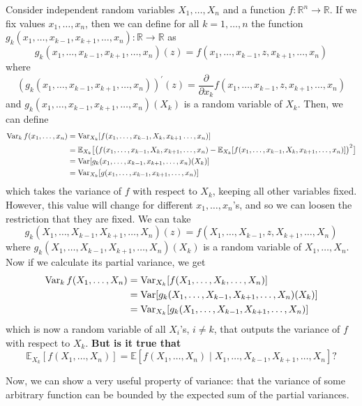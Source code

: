   Consider independent random variables $X_1, \ldots, X_n$ and a function $f: \mathbb{R}^n \longrightarrow \mathbb{R}$. If we fix values $x_1, \ldots, x_n$, then we can define for all $k = 1, \ldots, n$ the function $g_{k}(x_1, \ldots, x_{k-1}, x_{k+1}, \ldots, x_n): \mathbb{R} \rightarrow \mathbb{R}$ as 
  \[g_{k}(x_1, \ldots, x_{k-1}, x_{k+1}, \ldots, x_n)(z) = f(x_1, \ldots, x_{k-1}, z, x_{k+1}, \ldots, x_n)\]
  where 
  \[(g_{k}(x_1, \ldots, x_{k-1}, x_{k+1}, \ldots, x_n))^\prime (z) = \frac{\partial}{\partial x_k} f(x_1, \ldots, x_{k-1}, z, x_{k+1}, \ldots, x_n)\]
  and $g_k (x_1, \ldots, x_{k-1}, x_{k+1}, \ldots, x_n) (X_k)$ is a random variable of $X_k$. Then, we can define 
  \begin{align*}
      \operatorname{Var}_k f(x_1, \ldots, x_n) & = \operatorname{Var}_{X_k} [ f(x_1, \ldots, x_{k-1}, X_k, x_{k+1} \ldots, x_n)] \\ 
      & = \mathbb{E}_{X_k} \big[ \big( f (x_1, \ldots, x_{k-1}, X_k, x_{k+1}, \ldots, x_n) - \mathbb{E}_{X_k} [f (x_1, \ldots, x_{k-1}, X_k, x_{k+1}, \ldots, x_n)] \big)^2 \big] \\
      & = \operatorname{Var}[g_{k} (x_1, \ldots, x_{k-1}, x_{k+1}, \ldots, x_n) (X_k)] \\
      & = \operatorname{Var}_{X_k} [g(x_1, \ldots, x_{k-1}, x_{k+1}, \ldots, x_n)] 
  \end{align*}
  which takes the variance of $f$ with respect to $X_k$, keeping all other variables fixed. However, this value will change for different $x_1, \ldots, x_n$'s, and so we can loosen the restriction that they are fixed. We can take 
  \[g_k (X_1, \ldots, X_{k-1}, X_{k+1}, \ldots, X_n) (z) = f(X_1, \ldots, X_{k-1}, z, X_{k+1}, \ldots, X_n)\]
  where $g_k (X_1, \ldots, X_{k-1}, X_{k+1}, \ldots, X_n) (X_k)$ is a random variable of $X_1, \ldots, X_n$. Now if we calculate its partial variance, we get 
  \begin{align*}
      \operatorname{Var}_k f(X_1, \ldots, X_n) & = \operatorname{Var}_{X_k} [f(X_1, \ldots, X_k, \ldots, X_n)]\\
      & = \operatorname{Var} [g_k (X_1, \ldots, X_{k-1}, X_{k+1}, \ldots, X_n) (X_k)] \\
      & = \operatorname{Var}_{X_k} [g_k (X_1, \ldots, X_{k-1}, X_{k+1}, \ldots, X_n)]
  \end{align*}
  which is now a random variable of all $X_i$'s, $i \neq k$, that outputs the variance of $f$ with respect to $X_k$. \textbf{But is it true that }
  \[\mathbb{E}_{X_k} [ f(X_1, \ldots, X_n)] = \mathbb{E}[ f(X_1, \ldots, X_n) \mid X_1, \ldots, X_{k-1}, X_{k+1}, \ldots, X_n] ?\]


  Now, we can show a very useful property of variance: that the variance of some arbitrary function can be bounded by the expected sum of the partial variances. 

